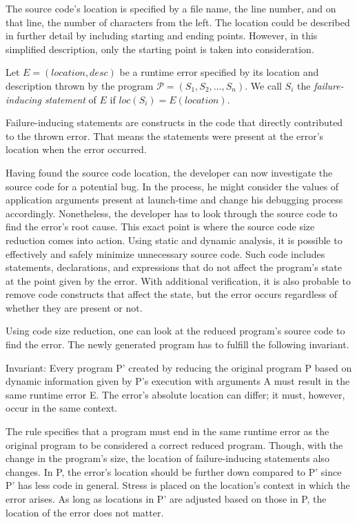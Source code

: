 The source code's location is specified by a file name, the line number, and 
on that line, the number of characters from the left.
The location could be described in further detail by including starting and 
ending points.
However, in this simplified description, only the starting point is taken 
into consideration.

\begin{defn}\label{def04:1}
  Let $E = (location, desc)$ be a runtime error specified by its location 
  and description thrown by the program $\mathcal{P} =
  (S_1, S_2, \ldots, S_n)$.
  We call $S_i$ the \emph{failure-inducing statement} of 
  $E$ if $loc(S_i) = E(location)$.
\end{defn}

Failure-inducing statements are constructs in the code that directly 
contributed to the thrown error.
That means the statements were present at the error's location when the error 
occurred.

Having found the source code location, the developer can now investigate 
the source code for a potential bug.
In the process, he might consider the values of application arguments 
present at launch-time and change his debugging process accordingly.
Nonetheless, the developer has to look through the source code to find 
the error's root cause.
This exact point is where the source code size reduction comes into action.
Using static and dynamic analysis, it is possible to effectively and 
safely minimize unnecessary source code.
Such code includes statements, declarations, and expressions that do not 
affect the program's state at the point given by the error.
With additional verification, it is also probable to remove code constructs 
that affect the state, but the error occurs regardless of whether they 
are present or not.

Using code size reduction, one can look at the reduced program's source 
code to find the error.
The newly generated program has to fulfill the following invariant.

Invariant: Every program P' created by reducing the original program P 
based on dynamic information given by P's execution with arguments A 
must result in the same runtime error E.
The error's absolute location can differ; it must, however, occur in the 
same context.

The rule specifies that a program must end in the same runtime error 
as the original program to be considered a correct reduced program.
Though, with the change in the program's size, the location 
of failure-inducing statements also changes.
In P, the error's location should be further down compared to 
P' since P' has less code in general.
Stress is placed on the location's context in which the error arises.
As long as locations in P' are adjusted based on those in P, the 
location of the error does not matter.

